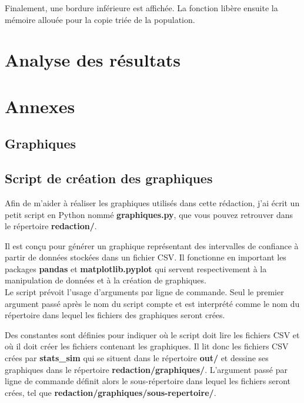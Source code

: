 \documentclass[12pt,french,titlepage]{article}
\begin{document}
Finalement, une bordure inférieure est affichée. La fonction libère ensuite la mémoire allouée pour la copie triée de la population.

\newpage

\section{Analyse des résultats}
\label{sec:analyse}

\newpage

\section{Annexes}

\subsection{Graphiques}

\newpage
\subsection{Script de création des graphiques}
Afin de m'aider à réaliser les graphiques utilisés dans cette rédaction, j'ai écrit un petit script en Python nommé \textbf{graphiques.py}, que vous pouvez retrouver dans le répertoire \textbf{redaction/}. 

Il est conçu pour générer un graphique représentant des intervalles de confiance à partir de données stockées dans un fichier CSV. Il fonctionne en important les packages \textbf{pandas} et \textbf{matplotlib.pyplot} qui servent respectivement à la manipulation de données et à la création de graphiques.\\

Le script prévoit l'usage d'arguments par ligne de commande. Seul le premier argument passé après le nom du script compte et est interprété comme le nom du répertoire dans lequel les fichiers des graphiques seront crées.

Des constantes sont définies pour indiquer où le script doit lire les fichiers CSV et où il doit créer les fichiers contenant les graphiques. Il lit donc les fichiers CSV crées par \textbf{stats\_sim} qui se situent dans le répertoire \textbf{out/} et dessine ses graphiques dans le répertoire \textbf{redaction/graphiques/}. L'argument passé par ligne de commande définit alors le sous-répertoire dans lequel les fichiers seront crées, tel que \textbf{redaction/graphiques/sous-repertoire/}.\\
\end{document}
